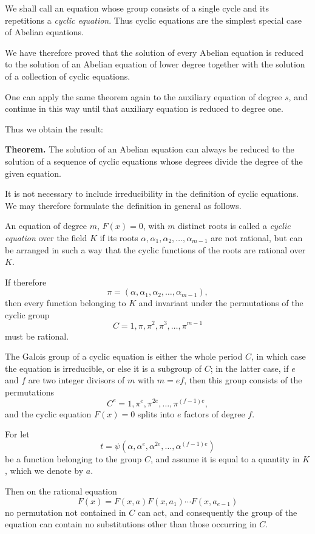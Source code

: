 \documentclass[11pt,a4paper]{book}
\begin{document}
We shall call an equation whose group consists of a single cycle and its repetitions a \emph{cyclic equation}. Thus cyclic equations are the simplest special case of Abelian equations.

We have therefore proved that the solution of every Abelian equation is reduced to the solution of an Abelian equation of lower degree together with the solution of a collection of cyclic equations.

One can apply the same theorem again to the auxiliary equation of degree $s$, and continue in this way until that auxiliary equation is reduced to degree one.

Thus we obtain the result:

\medskip
\noindent\textbf{Theorem.}
The solution of an Abelian equation can always be reduced to the solution of a sequence of cyclic equations whose degrees divide the degree of the given equation.

\medskip
It is not necessary to include irreducibility in the definition of cyclic equations. We may therefore formulate the definition in general as follows.

An equation of degree $m$, $F(x)=0$, with $m$ distinct roots is called a \emph{cyclic equation} over the field $K$ if its roots $\alpha,\alpha_1,\alpha_2,\dots,\alpha_{m-1}$ are not rational, but can be arranged in such a way that the cyclic functions of the roots are rational over $K$.

If therefore
\[
\pi=(\alpha,\alpha_1,\alpha_2,\dots,\alpha_{m-1}),
\tag{6}
\]
then every function belonging to $K$ and invariant under the permutations of the cyclic group
\[
C=1,\pi,\pi^2,\pi^3,\dots,\pi^{m-1}
\tag{7}
\]
must be rational.

The Galois group of a cyclic equation is either the whole period $C$, in which case the equation is irreducible, or else it is a subgroup of $C$; in the latter case, if $e$ and $f$ are two integer divisors of $m$ with $m=ef$, then this group consists of the permutations
\[
C^e = 1,\pi^e,\pi^{2e},\dots,\pi^{(f-1)e},
\tag{8}
\]
and the cyclic equation $F(x)=0$ splits into $e$ factors of degree $f$.

For let
\[
t=\psi(\alpha,\alpha^e,\alpha^{2e},\dots,\alpha^{(f-1)e})
\]
be a function belonging to the group $C$, and assume it is equal to a quantity in $K$, which we denote by $a$.

Then on the rational equation
\[
F(x)=F(x,a)F(x,a_1)\cdots F(x,a_{e-1})
\]
no permutation not contained in $C$ can act, and consequently the group of the equation can contain no substitutions other than those occurring in $C$.
\end{document}
